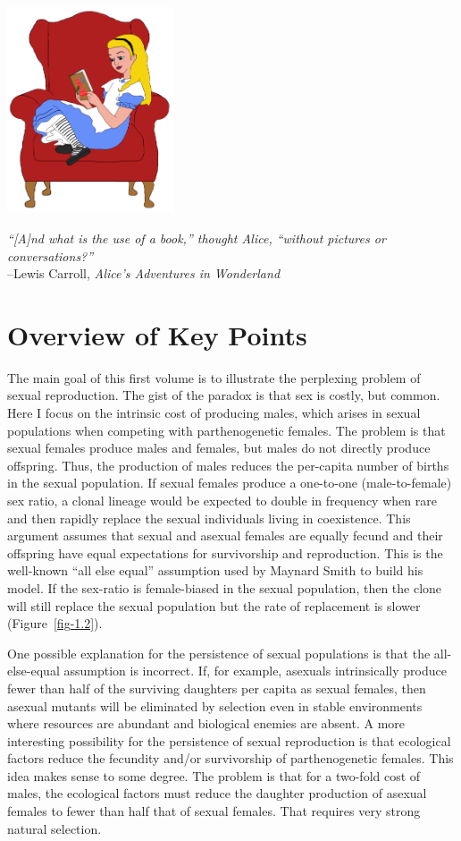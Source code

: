 \documentclass[
  letterpaper,
]{book}
\begin{document}
\begin{center}
\includegraphics[width=0.37\textwidth,height=\textheight]{images/fig7-1.png}
\end{center}

\emph{``{[}A{]}nd what is the use of a book,'' thought Alice, ``without
pictures or conversations?''}\\
--Lewis Carroll, \emph{Alice's Adventures in Wonderland}

\section{Overview of Key Points}\label{overview-of-key-points}

The main goal of this first volume is to illustrate the perplexing
problem of sexual reproduction. The gist of the paradox is that sex is
costly, but common. Here I focus on the intrinsic cost of producing
males, which arises in sexual populations when competing with
parthenogenetic females. The problem is that sexual females produce
males and females, but males do not directly produce offspring. Thus,
the production of males reduces the per-capita number of births in the
sexual population. If sexual females produce a one-to-one
(male-to-female) sex ratio, a clonal lineage would be expected to double
in frequency when rare and then rapidly replace the sexual individuals
living in coexistence. This argument assumes that sexual and asexual
females are equally fecund and their offspring have equal expectations
for survivorship and reproduction. This is the well-known ``all else
equal'' assumption used by Maynard Smith to build his model. If the
sex-ratio is female-biased in the sexual population, then the clone will
still replace the sexual population but the rate of replacement is
slower (Figure~\ref{fig-1.2}).

One possible explanation for the persistence of sexual populations is
that the all-else-equal assumption is incorrect. If, for example,
asexuals intrinsically produce fewer than half of the surviving
daughters per capita as sexual females, then asexual mutants will be
eliminated by selection even in stable environments where resources are
abundant and biological enemies are absent. A more interesting
possibility for the persistence of sexual reproduction is that
ecological factors reduce the fecundity and/or survivorship of
parthenogenetic females. This idea makes sense to some degree. The
problem is that for a two-fold cost of males, the ecological factors
must reduce the daughter production of asexual females to fewer than
half that of sexual females. That requires very strong natural
selection.
\end{document}
